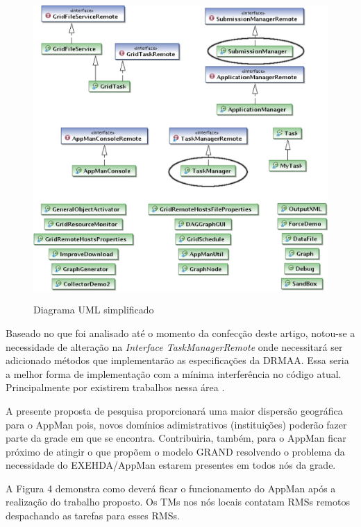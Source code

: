\begin{figure}[h]
\center
\includegraphics[scale=.16]{img/UML.eps}
\label{TaskManager}
\caption{Diagrama UML simplificado}
\end{figure}

Baseado no que foi analisado até o momento da confecção deste artigo, notou-se a necessidade de alteração na {\it Interface TaskManagerRemote} onde necessitará ser adicionado métodos que implementarão as especificações da DRMAA. Essa seria a melhor forma de implementação com a mínima interferência no código atual. Principalmente por existirem trabalhos nessa área \cite{Nobres2007}.

A presente proposta de pesquisa proporcionará uma maior dispersão geográfica para o AppMan pois, novos domínios adimistrativos (instituições) poderão fazer parte da grade em que se encontra. Contribuiria, também, para o AppMan ficar próximo de atingir o que propõem o modelo GRAND resolvendo o problema da necessidade do EXEHDA/AppMan estarem presentes em todos nós da grade. 

A Figura 4 demonstra como deverá ficar o funcionamento do AppMan após a realização do trabalho proposto. Os TMs nos nós locais contatam RMSs remotos despachando as tarefas para esses RMSs.

